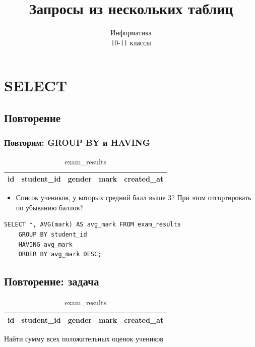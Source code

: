 \documentclass[compress,red]{beamer}
\title{Запросы из нескольких таблиц}
\author{Информатика \\ 10-11 классы}
\begin{document}
\maketitle

\section{SELECT}

\subsection{Повторение}
\begin{frame}[fragile]
  \frametitle{Повторим: GROUP BY и HAVING}
  \begin{table}
    \begin{tabular}{|c|c|c|c|c|}
      \hline
      id & student\_id & gender & mark & created\_at\\
      \hline
    \end{tabular}
    \caption{exam\_results}
  \end{table}
  \begin{itemize}
    \item Список учеников, у которых средний балл выше 3? При этом отсортировать по убыванию баллов?
  \end{itemize}
  \scriptsize{
  \begin{lstlisting}[label=sql1,caption=GROUP BY HAVING]
    SELECT *, AVG(mark) AS avg_mark FROM exam_results
    GROUP BY student_id
    HAVING avg_mark
    ORDER BY avg_mark DESC;
  \end{lstlisting}
  }
\end{frame}

\subsection{Повторение: задача}
\begin{frame}
  \begin{table}
    \begin{tabular}{|c|c|c|c|c|}
      \hline
      id & student\_id & gender & mark & created\_at\\
      \hline
    \end{tabular}
    \caption{exam\_results}
  \end{table}
  \begin{center}
    \Large{Найти сумму всех положительных оценок учеников}
  \end{center}
\end{frame}
\end{document}
